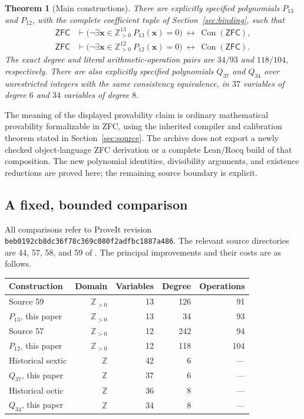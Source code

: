 \documentclass[11pt,a4paper]{article}
\newtheorem{theorem}{Theorem}[section]
\theoremstyle{definition}
\theoremstyle{remark}
\newcommand{\Z}{\mathbb Z}
\newcommand{\Zpos}{\mathbb Z_{>0}}
\newcommand{\Con}{\operatorname{Con}}
\newcommand{\ZFC}{\mathsf{ZFC}}
\newcommand{\snapshot}{\texttt{beb0192cb8dc36f78c369c080f2adfbc1887a486}}
\begin{document}
\begin{theorem}[Main constructions]
\label{thm:main}
There are explicitly specified polynomials \(P_{13}\) and \(P_{12}\), with
the complete coefficient tuple of Section~\ref{sec:binding}, such that
\begin{align*}
 \ZFC&\vdash
 \bigl(\neg\exists\boldsymbol{x}\in\Zpos^{13}\ 
                  P_{13}(\boldsymbol{x})=0\bigr)
       \ \longleftrightarrow\ \Con(\ZFC),\\
 \ZFC&\vdash
 \bigl(\neg\exists\boldsymbol{x}\in\Zpos^{12}\ 
                  P_{12}(\boldsymbol{x})=0\bigr)
       \ \longleftrightarrow\ \Con(\ZFC).
\end{align*}
The exact degree and literal arithmetic-operation pairs are \(34/93\)
and \(118/104\), respectively. There are also explicitly specified
polynomials \(Q_{37}\) and \(Q_{34}\) over unrestricted integers with
the same consistency equivalence, in \(37\) variables of degree \(6\)
and \(34\) variables of degree \(8\).
\end{theorem}

The meaning of the displayed provability claim is ordinary mathematical
provability formalizable in ZFC, using the inherited compiler and
calibration theorem stated in Section~\ref{sec:source}. The archive does
not export a newly checked object-language ZFC derivation or a complete
Lean/Rocq build of that composition. The new polynomial identities,
divisibility arguments, and existence reductions are proved here; the
remaining source boundary is explicit.

\subsection{A fixed, bounded comparison}

All comparisons refer to ProveIt revision \snapshot.
The relevant source directories are 44, 57, 58, and 59 of
.
The principal improvements and their costs are as follows.

\begin{center}
\begin{tabular}{@{}lrrrr@{}}
\toprule
Construction & Domain & Variables & Degree & Operations\\
\midrule
Source 59 & \(\Zpos\) & 13 & 126 & 91\\
\(P_{13}\), this paper & \(\Zpos\) & 13 & 34 & 93\\
Source 57 & \(\Zpos\) & 12 & 242 & 94\\
\(P_{12}\), this paper & \(\Zpos\) & 12 & 118 & 104\\
\midrule
Historical sextic & \(\Z\) & 42 & 6 & ---\\
\(Q_{37}\), this paper & \(\Z\) & 37 & 6 & ---\\
Historical octic & \(\Z\) & 36 & 8 & ---\\
\(Q_{34}\), this paper & \(\Z\) & 34 & 8 & ---\\
\bottomrule
\end{tabular}
\end{center}
\end{document}
